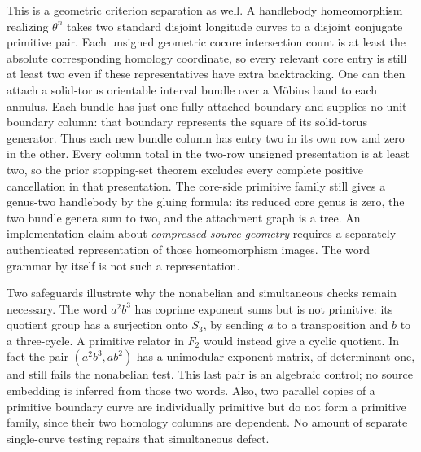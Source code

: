 This is a geometric criterion separation as well.  A handlebody homeomorphism
realizing $\theta^n$ takes two standard disjoint longitude curves to a
disjoint conjugate primitive pair. Each unsigned geometric cocore
intersection count is at least the absolute corresponding homology
coordinate, so every relevant core entry is still at least two even if
these representatives have extra backtracking. One can then attach a solid-torus
orientable interval bundle over a M\"obius band to each annulus.  Each
bundle has just one fully attached boundary and supplies no unit boundary
column: that boundary represents the square of its solid-torus generator.
Thus each new bundle column has entry two in its own row and zero in the
other. Every column total in the two-row unsigned presentation is at least
two, so the prior stopping-set theorem excludes every complete positive
cancellation in that presentation. The core-side primitive family still
gives a genus-two handlebody by the gluing formula: its reduced core genus
is zero, the two bundle genera sum to two, and the attachment graph is a
tree. An implementation claim about \emph{compressed source geometry}
requires a separately authenticated representation of those homeomorphism
images.  The word grammar by itself is not such a representation.

Two safeguards illustrate why the nonabelian and simultaneous checks remain
necessary.  The word $a^2b^3$ has coprime exponent sums but is not primitive:
its quotient group has a surjection onto $S_3$, by sending $a$ to a
transposition and $b$ to a three-cycle.  A primitive relator in $F_2$
would instead give a cyclic quotient.  In fact the pair $(a^2b^3,ab^2)$
has a unimodular exponent matrix, of determinant one, and still fails
the nonabelian test.  This last pair is an algebraic control; no source
embedding is inferred from those two words.
Also, two parallel copies of a primitive boundary curve are individually
primitive but do not form a primitive family, since their two homology
columns are dependent.  No amount of separate single-curve testing repairs
that simultaneous defect.
